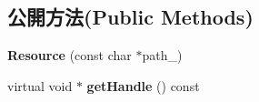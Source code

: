 \subsection*{公開方法(Public Methods)}
\begin{DoxyCompactItemize}
\item 
{\bfseries Resource} (const char $\ast$path\+\_\+)\hypertarget{class_i_dream_sky_1_1_font_1_1_resource_ac0793d57b2e69dc2541223f61ad6d95e}{}\label{class_i_dream_sky_1_1_font_1_1_resource_ac0793d57b2e69dc2541223f61ad6d95e}

\item 
virtual void $\ast$ {\bfseries get\+Handle} () const \hypertarget{class_i_dream_sky_1_1_font_1_1_resource_a46f1e33b34b4a6eafc2c1e63124acfa5}{}\label{class_i_dream_sky_1_1_font_1_1_resource_a46f1e33b34b4a6eafc2c1e63124acfa5}


\end{DoxyCompactItemize}
